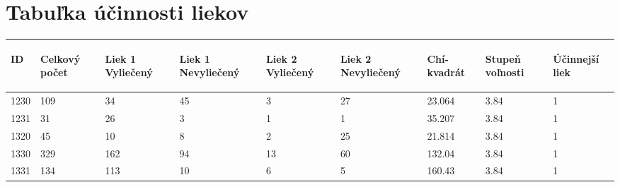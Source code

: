 \section{Tabuľka účinnosti liekov}
\label{app:ucinnost-liekov}

\begin{longtable}{lllllllll}
\hline
\begin{sideways} ID \end{sideways} & \begin{sideways} Celkový počet \end{sideways} & \begin{sideways} Liek 1 Vyliečený \end{sideways} & \begin{sideways} Liek 1 Nevyliečený \end{sideways} & \begin{sideways} Liek 2 Vyliečený \end{sideways} & \begin{sideways} Liek 2 Nevyliečený \end{sideways} & \begin{sideways} Chí-kvadrát\end{sideways} & \begin{sideways} Stupeň voľnosti \end{sideways}  &  \begin{sideways} Účinnejší liek \end{sideways} \\ \hline
1230 & 109           & 34               & 45                 & 3                & 27                 & \cellcolor[HTML]{9AFF99}23.064 & 3.84 & \cellcolor[HTML]{FFCC67}1 \\
1231 & 31            & 26               & 3                  & 1                & 1                  & \cellcolor[HTML]{9AFF99}35.207 & 3.84 & \cellcolor[HTML]{FFCC67}1 \\
1320 & 45            & 10               & 8                  & 2                & 25                 & \cellcolor[HTML]{9AFF99}21.814 & 3.84 & \cellcolor[HTML]{FFCC67}1 \\
1330 & 329           & 162              & 94                 & 13               & 60                 & \cellcolor[HTML]{9AFF99}132.04 & 3.84 & \cellcolor[HTML]{FFCC67}1 \\
1331 & 134           & 113              & 10                 & 6                & 5                  & \cellcolor[HTML]{9AFF99}160.43 & 3.84 & \cellcolor[HTML]{FFCC67}1 \\

\end{longtable}
